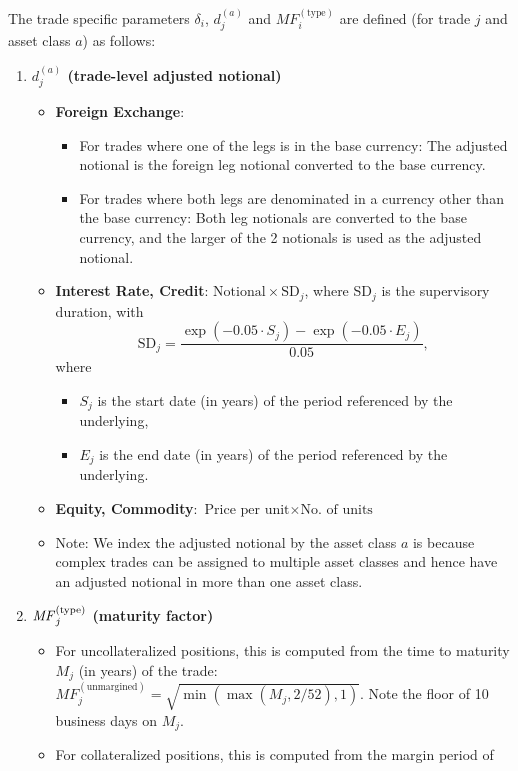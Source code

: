 The trade specific parameters $\delta_i$, $d_j^{(a)}$ and $MF_i^{(\text{type})}$ are defined
(for trade $j$ and asset class $a$) as follows:
\begin{enumerate}
\item {\bf $d_j^{(a)}$ (trade-level adjusted notional)}
\begin{itemize}
\item {\bf Foreign Exchange}:\begin{itemize}
  \item For trades where one of the legs is in the base currency: The adjusted notional is the foreign leg notional
  converted to the base currency.
  \item For trades where both legs are denominated in a currency other than the base currency: Both leg notionals are
  converted to the base currency, and the larger of the 2 notionals is used as the adjusted notional.
\end{itemize}
\item {\bf Interest Rate, Credit}: $\text{Notional} \times \text{SD}_j$, where SD$_j$ is the supervisory duration,
with \begin{equation*}
 \text{SD}_j = \frac{\exp{(-0.05 \cdot S_j)} - \exp{(-0.05 \cdot E_j)}}{0.05},
\end{equation*}
where \begin{itemize}
    \item $S_j$ is the start date (in years) of the period referenced by the underlying,
    \item $E_j$ is the end date (in years) of the period referenced by the underlying.
  \end{itemize}
\item {\bf Equity, Commodity}: $\text{Price per unit} \times \text{No.\ of units}$
\item Note: We index the adjusted notional by the asset class $a$ is because complex trades can be assigned
  to multiple asset classes and hence have an adjusted notional in more than one asset class.
\end{itemize}
\item {\bf $\mathit{MF}_j^{(\text{type})}$ (maturity factor)}
\begin{itemize}
\item For uncollateralized positions, this is computed from the time to
 maturity $M_j$ (in years) of the trade: $MF_j^{(\text{unmargined})} = \sqrt{\min(\max(M_j, 2/52),1)}$. Note the
 floor of 10 business days on $M_j$.
\item For collateralized positions, this is computed from the margin period of

\end{itemize}
\end{enumerate}
